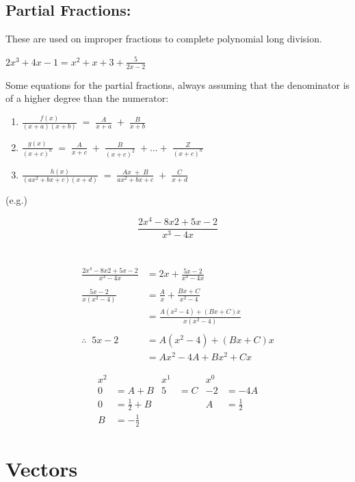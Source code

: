 \documentclass[a5paper]{article}
\begin{document}
	\subsection{Partial Fractions:}
	These are used on improper fractions to complete polynomial long division.
	\smallskip
	\begin{center}
		\break\hfill\break\break
		$2x^{3}+4x-1=x^{2}+x+3+\frac{5}{2x-2}$
	\end{center}
	Some equations for the partial fractions, always assuming that the denominator is of a higher degree than the numerator:
	\begin{enumerate}
		\item $\frac{f(x)}{(x+a)(x+b)}\;=\;\frac{A}{x+a}\;+\;\frac{B}{x+b}$
		\item $\frac{g(x)}{(x+c)^{n}}\;=\;\frac{A}{x+c}\;+\;\frac{B}{(x+c)^{2}}\;+\ldots+\;\frac{Z}{(x+c)^{n}}$
		\item $\frac{h(x)}{(ax^{2}+bx+c)(x+d)}\;=\;\frac{Ax\;+\;B}{ax^{2}+bx+c}\;+\;\frac{C}{x+d}$
	\end{enumerate}
	(e.g.)
	\begin{center}
		$$\frac{2x^{4}-8x{2}+5x-2}{x^{3}-4x}$$\\
		\\
		\begin{align*}
			\frac{2x^{4}-8x{2}+5x-2}{x^{3}-4x}&=2x+\frac{5x-2}{x^{3}-4x}\\\\
			\frac{5x-2}{x(x^{2}-4)}&=\frac{A}{x}+\frac{Bx+C}{x^{2}-4}\\
			&=\frac{A(x^{2}-4)+(Bx+C)x}{x(x^{2}-4)}\\\\
			\therefore\;\;5x-2&=A(x^{2}-4)+(Bx+C)x\\
			&=Ax^{2}-4A+Bx^{2}+Cx
		\end{align*}
	
		\begin{align*}
			x^{2} & & x^{1} & & x^{0} \\
			0&=A+B & 5&=C & -2&=-4A \\
			0&=\frac{1}{2}+B &  &  & A&= \frac{1}{2} \\
			B&=-\frac{1}{2} &  &  &  &
		\end{align*}
	\end{center}

	\pagebreak

	\section{Vectors}
\end{document}
